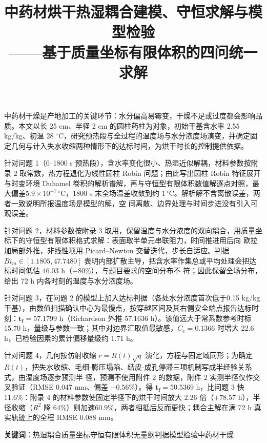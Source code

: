 \documentclass[12pt,a4paper]{ctexart}
\title{\textbf{中药材烘干热湿耦合建模、守恒求解与模型检验}\\[2pt]
——基于质量坐标有限体积的四问统一求解}
\author{}
\date{}
\numberwithin{equation}{section}
\renewenvironment{abstract}{%
  \normalsize
  \begin{center}{\songti\bfseries\zihao{4}\abstractname}\end{center}
  \par
}{\par}
\begin{document}
\maketitle

\begin{abstract}

中药材干燥是产地加工的关键环节：水分偏高易霉变，干燥不足或过度都会影响品质。本文以长 25 cm、半径 2 cm 的圆柱药柱为对象，初始干基含水率 2.55 kg/kg、初温 28
${}^\circ$C，研究预热段与全过程的温度场与水分浓度场演变，并确定固定几何与计入失水收缩两种情形下的达标时间，为烘干时长的控制提供依据。

针对问题 1（0--1800 s 预热段），含水率变化很小、热湿近似解耦，材料参数按附录 2 取常数，热方程退化为线性圆柱 Robin 问题；由此写出圆柱 Robin 特征展开与时变环境 Duhamel
卷积的解析谱解，再与守恒型有限体积数值解逐点对照，最大偏差$5.9\times10^{-7}\,^{\circ}$C，1800 s 末全场温差收敛到约 $1\,^{\circ}$C。解析解不含离散误差，两者一致说明所报温度场是模型的解，空
间离散、边界处理与时间步进没有引入可观误差。

针对问题 2，材料参数按附录 3 取用，保留温度与水分浓度的双向耦合，用质量坐标下的守恒型有限体积格式求解：表面取半单元串联阻力，时间推进用后向
欧拉加局部外推，非线性项用 Picard--Newton 交替迭代，步长自适应。判据$Bi_m\in[1.1805,47.7480]$ 表明内部扩散主导，把含水率作集总或平均处理会把达标时间低估 46.03 h（$-80\%$），与题目要求的空间分布不
符；因此保留全场分布，给出 72 h 内各时刻的温度与水分浓度场。

针对问题 3，在问题 2 的模型上加入达标判据（各处水分浓度首次低于0.15 kg/kg 干基），由数值扫描确认中心为最慢点，按穿越区间及其右侧安全端点报告达标时刻：$\bm{t_f=57.1799}$ h（Richardson
外推 57.1636 h）。该值远大于常系数参考时标15.70 h，量级与参数一致；其中对边界汇取值最敏感，$C_e=0.1366$ 时增大 22.6 h，已检验因素的累计偏移量级约 1.71 h。

针对问题 4，几何按仿射收缩 $r=R(t)\sqrt q$ 演化，方程与固定域同形；为确定$R(t)$，把失水收缩、毛细-膨压塌陷、结皮-成孔停滞三项机制写成半经验关系式，由湿度场逐步预测半
径，预测不使用附件 2 的数据，附件 2 实测半径仅作交叉验证（RMSE 0.047 mm、偏差 $-0.56\%$）。得 $\bm{t_f=50.5369}$ h，比问题 3 快 $11.6\%$：附录 4 的材料参数使固定半径下的烘干时间放大 $2.26$ 倍（$+78.57$ h），半径收缩（$R^2$ 降
64\%）则加速$60.9\%$，两者相抵后反而更快；耦合主解在满 72 h 真实轨迹上的全程 RMSE 0.088 mm。

\smallskip\noindent\textbf{关键词}：热湿耦合\enspace 质量坐标\enspace 守恒有限体积\enspace 无量纲判据\enspace 模型检验\enspace 中药材干燥
\end{abstract}
\end{document}
